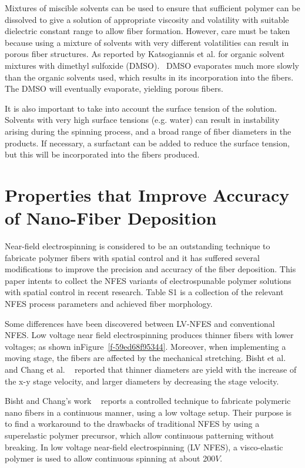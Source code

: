 \documentclass[5p,,preprint,12pt,twocolumn]{elsarticle}
\begin{document}
Mixtures of miscible solvents can be used to ensure that sufficient polymer can be dissolved to give a solution of appropriate viscosity and volatility with suitable dielectric constant range to allow fiber formation. However, care must be taken because using a mixture of solvents with very different volatilities can result in porous fiber structures. As reported by Katsogiannis et al. for organic solvent mixtures with dimethyl sulfoxide (DMSO).\unskip~\cite{527120:13082766} DMSO evaporates much more slowly than the organic solvents used, which results in its incorporation into the fibers. The DMSO will eventually evaporate, yielding porous fibers.

It is also important to take into account the surface tension of the solution. Solvents with very high surface tensions (e.g. water) can result in instability arising during the spinning process, and a broad range of fiber diameters in the products. If necessary, a surfactant can be added to reduce the surface tension, but this will be incorporated into the fibers produced.
    
\section{Properties that Improve Accuracy of Nano-Fiber Deposition}
Near-field electrospinning is considered to be an outstanding technique to fabricate polymer fibers with spatial control and it has suffered several modifications to improve the precision and accuracy of the fiber deposition. This paper intents to collect the NFES variants of electrospunable polymer solutions with spatial control in recent research. Table S1 is a collection of the relevant NFES process parameters and achieved fiber morphology.

Some differences have been discovered between LV-NFES and conventional NFES. Low voltage near field electrospinning produces thinner fibers with lower voltages; as shown inFigure~\ref{f-59ed68f95344}. Moreover, when implementing a moving stage, the fibers are affected by the mechanical stretching. Bisht et al. and Chang et al. \unskip~\cite{527120:11973130,527120:11974313} reported that thinner diameters are yield with the increase of the x-y stage velocity, and larger diameters by decreasing the stage velocity.

Bisht and Chang's work \unskip~\cite{527120:11973130,527120:11974313} reports a controlled technique to fabricate polymeric nano fibers in a continuous manner, using a low voltage setup. Their purpose is to find a workaround to the drawbacks of traditional NFES by using a superelastic polymer precursor, which allow continuous patterning without breaking. In low voltage near-field electrospinning (LV NFES), a visco-elastic polymer is used to allow continuous spinning at about 200$V $.
\end{document}
